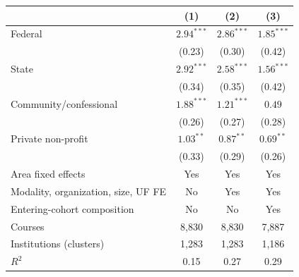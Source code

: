 \begin{tabular}{lccc}
\toprule
 & (1) & (2) & (3) \\
\midrule
Federal & $2.94^{***}$ & $2.86^{***}$ & $1.85^{***}$ \\
 & (0.23) & (0.30) & (0.42) \\
State & $2.92^{***}$ & $2.58^{***}$ & $1.56^{***}$ \\
 & (0.34) & (0.35) & (0.42) \\
Community/confessional & $1.88^{***}$ & $1.21^{***}$ & $0.49$ \\
 & (0.26) & (0.27) & (0.28) \\
Private non-profit & $1.03^{**}$ & $0.87^{**}$ & $0.69^{**}$ \\
 & (0.33) & (0.29) & (0.26) \\
\midrule
Area fixed effects & Yes & Yes & Yes \\
Modality, organization, size, UF FE & No & Yes & Yes \\
Entering-cohort composition & No & No & Yes \\
Courses & 8{,}830 & 8{,}830 & 7{,}887 \\
Institutions (clusters) & 1{,}283 & 1{,}283 & 1{,}186 \\
$R^2$ & 0.15 & 0.27 & 0.29 \\
\bottomrule
\end{tabular}
